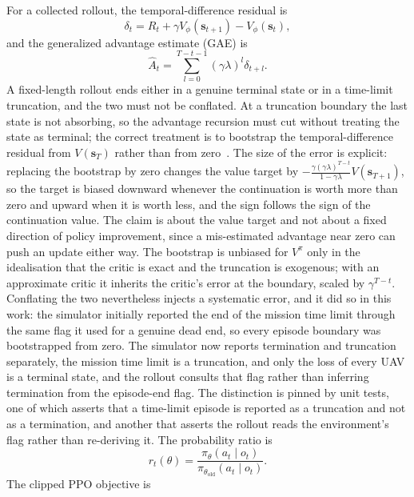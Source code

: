 \documentclass[conference]{IEEEtran}
\begin{document}
For a collected rollout, the temporal-difference residual is
\begin{equation}
\delta_t=R_t+\gamma V_{\phi}(\mathbf s_{t+1})-V_{\phi}(\mathbf s_t),
\label{eq:tdres}
\end{equation}
and the generalized advantage estimate (GAE) is
\begin{equation}
\widehat A_t=\sum_{l=0}^{T-t-1}(\gamma\lambda)^l\delta_{t+l}.
\label{eq:gae}
\end{equation}
A fixed-length rollout ends either in a genuine terminal state or in a time-limit truncation, and the two must not be conflated. At a truncation boundary the last state is not absorbing, so the advantage recursion must cut without treating the state as terminal; the correct treatment is to bootstrap the temporal-difference residual from $V(\mathbf s_{T})$ rather than from zero~\cite{pardo2018}. The size of the error is explicit: replacing the bootstrap by zero changes the value target by $-\frac{\gamma(\gamma\lambda)^{T-t}}{1-\gamma\lambda}V(\mathbf s_{T+1})$, so the target is biased downward whenever the continuation is worth more than zero and upward when it is worth less, and the sign follows the sign of the continuation value. The claim is about the value target and not about a fixed direction of policy improvement, since a mis-estimated advantage near zero can push an update either way. The bootstrap is unbiased for $V^\pi$ only in the idealisation that the critic is exact and the truncation is exogenous; with an approximate critic it inherits the critic's error at the boundary, scaled by $\gamma^{T-t}$. Conflating the two nevertheless injects a systematic error, and it did so in this work: the simulator initially reported the end of the mission time limit through the same flag it used for a genuine dead end, so every episode boundary was bootstrapped from zero. The simulator now reports termination and truncation separately, the mission time limit is a truncation, and only the loss of every UAV is a terminal state, and the rollout consults that flag rather than inferring termination from the episode-end flag. The distinction is pinned by unit tests, one of which asserts that a time-limit episode is reported as a truncation and not as a termination, and another that asserts the rollout reads the environment's flag rather than re-deriving it.
The probability ratio is
\begin{equation}
r_t(\theta)=\frac{\pi_\theta(a_t\mid o_t)}{\pi_{\theta_{\mathrm{old}}}(a_t\mid o_t)}.
\end{equation}
The clipped PPO objective is
\end{document}
